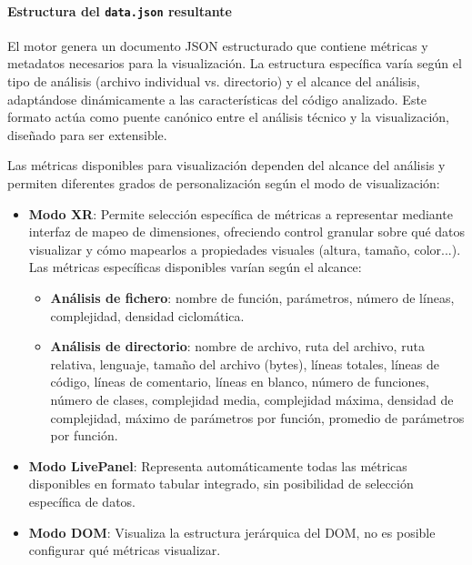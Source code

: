 \documentclass[a4paper, 12pt]{book}
\begin{document}

\paragraph{Estructura del \texttt{data.json} resultante}
El motor genera un documento JSON estructurado que contiene métricas y metadatos necesarios para la visualización. La estructura específica varía según el tipo de análisis (archivo individual vs. directorio) y el alcance del análisis, adaptándose dinámicamente a las características del código analizado. Este formato actúa como puente canónico entre el análisis técnico y la visualización, diseñado para ser extensible.

Las métricas disponibles para visualización dependen del alcance del análisis y permiten diferentes grados de personalización según el modo de visualización:

\begin{itemize}
  \item \textbf{Modo XR}: Permite selección específica de métricas a representar mediante interfaz de mapeo de dimensiones, ofreciendo control granular sobre qué datos visualizar y cómo mapearlos a propiedades visuales (altura, tamaño, color...). Las métricas específicas disponibles varían según el alcance:
  \begin{itemize}
    \item \textbf{Análisis de fichero}: nombre de función, parámetros, número de líneas, complejidad, densidad ciclomática.
    \item \textbf{Análisis de directorio}: nombre de archivo, ruta del archivo, ruta relativa, lenguaje, tamaño del archivo (bytes), líneas totales, líneas de código, líneas de comentario, líneas en blanco, número de funciones, número de clases, complejidad media, complejidad máxima, densidad de complejidad, máximo de parámetros por función, promedio de parámetros por función.
  \end{itemize}
  \item \textbf{Modo LivePanel}: Representa automáticamente todas las métricas disponibles en formato tabular integrado, sin posibilidad de selección específica de datos.
  \item \textbf{Modo DOM}: Visualiza la estructura jerárquica del DOM, no es posible configurar qué métricas visualizar.
\end{itemize}
\end{document}
